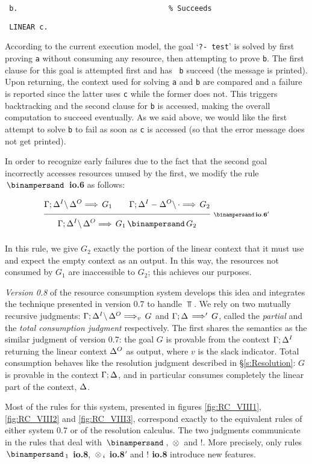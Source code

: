 {\tt \hspace*{2em} \indent b.\ \ \ \ \ \ \ \ \ \ \ \ \ \ \ \ \
  \ \ \ \ \ \ \ \ \ \ \ \ \ \ \ \ \ \ \% Succeeds\rule[-2ex]{0ex}{1ex}}

{\tt \hspace*{2em} \indent LINEAR c.}

\medskip
\noindent
According to the current execution model, the goal `{\tt ?- test}' is solved
by first proving {\tt a} without consuming any resource, then attempting to
prove {\tt b}. The first clause for this goal is attempted first and has {\tt
  b} succeed (the message is printed). Upon returning, the context used for
solving {\tt a} and {\tt b} are compared and a failure is reported since the
latter uses {\tt c} while the former does not. This triggers backtracking and
the second clause for {\tt b} is accessed, making the overall computation to
succeed eventually. As we said above, we would like the first attempt to
solve {\tt b} to fail as soon as {\tt c} is accessed (so that the error
message does not get printed).

In order to recognize early failures due to the fact that the second goal
incorrectly accesses resources unused by the first, we modify the rule {\bf
  $\With$ io.6} as follows:

$$
\ruleII
  {\ioVI{\G;\D^I}{\D^O}{G_1}}
  {\ioVI{\G;\D^I-\D^O}{\cdot}{G_2}}
  {\ioVI{\G;\D^I}{\D^O}{G_1 \With G_2}}
  {\With io.6'}
$$

\noindent
In this rule, we give $G_2$ exactly the portion of the linear context that it
must use and expect the empty context as an output. In this way, the
resources not consumed by $G_1$ are inaccessible to $G_2$; this achieves our
purposes.

{\em Version 0.8\/} of the resource consumption system develops this idea and
integrates the technique presented in version 0.7 to handle $\Top$. We rely
on two mutually recursive judgments: $\ioVIII{\G;\D^I}{\D^O}{G}{v}$ and
$\ioVIIIa{\G;\D}{G}$, called the {\em partial\/} and the {\em total
  consumption judgment\/} respectively. The first shares the semantics as
the similar judgment of version 0.7: the goal $G$ is provable from the
context $\G;\D^I$ returning the linear context $\D^O$ as output, where $v$ is
the slack indicator. Total consumption behaves like the resolution judgment
described in \S \ref{s:Resolution}: $G$ is provable in the context $\G;\D$,
and in particular consumes completely the linear part of the context, $\D$.

Most of the rules for this system, presented in figures \ref{fig:RC_VIII1},
\ref{fig:RC_VIII2} and \ref{fig:RC_VIII3}, correspond exactly to the
equivalent rules of either system 0.7 or of the resolution calculus. The two
judgments communicate in the rules that deal with $\With$, $\Times$ and $!$.
More precisely, only rules {\bf $\With_1$ io.8}, {\bf $\Times_i$ io.8$'$} and
{\bf $!$ io.8} introduce new features.

